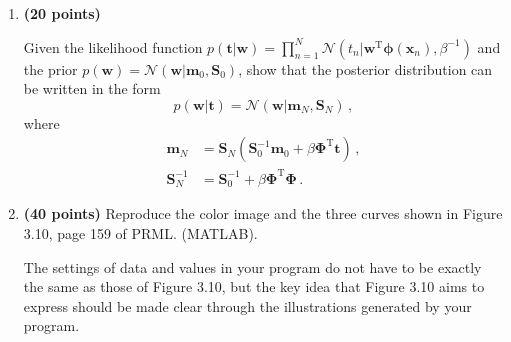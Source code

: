 \documentclass[12pt,twoside]{article}
\begin{document}
\begin{enumerate}
\medskip
\medskip

\item {\bf (20 points)} 

Given the likelihood function $p(\mathbf{t}|\mathbf{w}) = \prod_{n=1}^N \mathcal{N}(t_n|\mathbf{w}^\mathrm{T} \boldsymbol{\phi}(\mathbf{x}_n), \beta^{-1})$ and the prior $p(\mathbf{w}) = \mathcal{N}(\mathbf{w}|\mathbf{m}_0, \mathbf{S}_0)$, show that the posterior distribution can be written in the form
\[
p(\mathbf{w}|\mathbf{t}) =  \mathcal{N}(\mathbf{w}|\mathbf{m}_N, \mathbf{S}_N) \,,
\]
\noindent where 
\begin{equation*}
\begin{split}
\mathbf{m}_N &=  \mathbf{S}_N \left( \mathbf{S}_0^{-1} \mathbf{m}_0 + \beta \boldsymbol{\Phi}^\mathrm{T} \mathbf{t} \right) \,, \\
\mathbf{S}_N^{-1} &=  \mathbf{S}_0^{-1}  + \beta \boldsymbol{\Phi}^\mathrm{T} \boldsymbol{\Phi} \,.
\end{split}
\end{equation*}




\medskip
\medskip

\item {\bf (40 points)} Reproduce the color image and the three curves shown in Figure 3.10, page 159 of PRML. (MATLAB).

The settings of data and values in your program do not have to be exactly the same as those of Figure 3.10, but the key idea that Figure 3.10 aims to express should be made clear through the illustrations generated by your program.


\end{enumerate}
\end{document}
